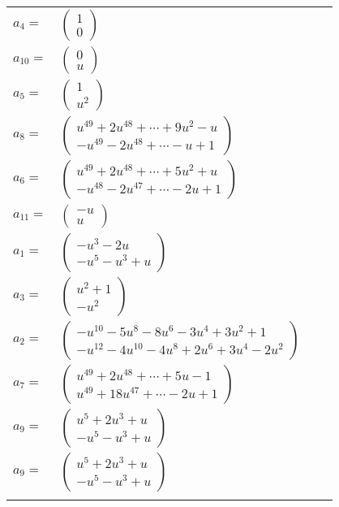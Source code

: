 \documentclass[1p]{elsarticle_modified}
\theoremstyle{definition}
\begin{document}
\begin{tabular}{m{7pt} m{180pt} m{7pt} m{180pt} }
\flushright $a_{4}=$&$\begin{pmatrix}1\\0\end{pmatrix}$ \\
\flushright $a_{10}=$&$\begin{pmatrix}0\\u\end{pmatrix}$ \\
\flushright $a_{5}=$&$\begin{pmatrix}1\\u^2\end{pmatrix}$ \\
\flushright $a_{8}=$&$\begin{pmatrix}u^{49}+2 u^{48}+\cdots+9 u^2- u\\- u^{49}-2 u^{48}+\cdots- u+1\end{pmatrix}$ \\
\flushright $a_{6}=$&$\begin{pmatrix}u^{49}+2 u^{48}+\cdots+5 u^2+u\\- u^{48}-2 u^{47}+\cdots-2 u+1\end{pmatrix}$ \\
\flushright $a_{11}=$&$\begin{pmatrix}- u\\u\end{pmatrix}$ \\
\flushright $a_{1}=$&$\begin{pmatrix}- u^3-2 u\\- u^5- u^3+u\end{pmatrix}$ \\
\flushright $a_{3}=$&$\begin{pmatrix}u^2+1\\- u^2\end{pmatrix}$ \\
\flushright $a_{2}=$&$\begin{pmatrix}- u^{10}-5 u^8-8 u^6-3 u^4+3 u^2+1\\- u^{12}-4 u^{10}-4 u^8+2 u^6+3 u^4-2 u^2\end{pmatrix}$ \\
\flushright $a_{7}=$&$\begin{pmatrix}u^{49}+2 u^{48}+\cdots+5 u-1\\u^{49}+18 u^{47}+\cdots-2 u+1\end{pmatrix}$ \\
\flushright $a_{9}=$&$\begin{pmatrix}u^5+2 u^3+u\\- u^5- u^3+u\end{pmatrix}$\\ \flushright $a_{9}=$&$\begin{pmatrix}u^5+2 u^3+u\\- u^5- u^3+u\end{pmatrix}$\\&\end{tabular}
\end{document}
